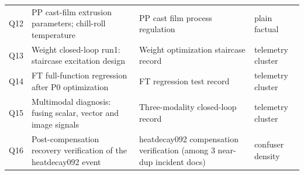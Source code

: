 \documentclass[preprint,12pt]{elsarticle}
\begin{document}
\begin{table}[!htbp]
\begin{tabular}{lp{5.3cm}p{4.0cm}p{2.8cm}}
Q12 & PP cast-film extrusion parameters; chill-roll temperature & PP cast
film process regulation & plain factual \\
Q13 & Weight closed-loop run1: staircase excitation design & Weight
optimization staircase record & telemetry cluster \\
Q14 & FT full-function regression after P0 optimization & FT regression test
record & telemetry cluster \\
Q15 & Multimodal diagnosis: fusing scalar, vector and image signals &
Three-modality closed-loop record & telemetry cluster \\
Q16 & Post-compensation recovery verification of the heatdecay092 event &
heatdecay092 compensation verification (among 3 near-dup incident docs) &
confuser density \\
\bottomrule
\end{tabular}
\end{table}
\end{document}
